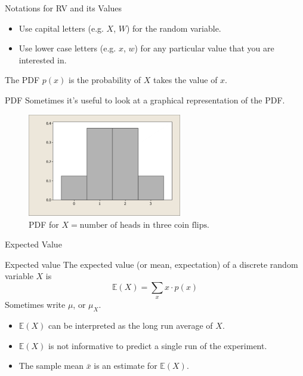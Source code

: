 \documentclass{beamer}
\newcommand{\E}{\mathbb{E}}
\let\thefootnote\relax\footnotetext{\tiny{*  Office Hours: Wed \& Fri 10:00 - 11:30 AM, KMC 8-174}}
\begin{document}
\begin{frame}{Notations for RV and its Values}
\begin{itemize}
\item Use capital letters (e.g. $X$, $W$) for the random variable.
\item Use lower case letters (e.g. $x$, $w$) for any particular value that you are interested in.
\end{itemize}

The PDF $p(x)$ is the probability of \alert{$X$} takes the value of \alert{$x$}. 
\end{frame}

\begin{frame}{PDF}
Sometimes it's useful to look at a graphical representation of the PDF.

\begin{figure}
    \caption{PDF for $X=\text{number of heads in three coin flips}$.}
    \includegraphics[width=0.6\textwidth]{figures/PDF.png}
\end{figure}

\let\thefootnote\relax{}
\end{frame}

\begin{frame}{Expected Value}
\begin{block}{Expected value}
The expected value (or mean, expectation) of a discrete random variable $X$ is
$$\E(X)=\sum_{x} x\cdot p(x)$$
Sometimes write $\mu$, or $\mu_X$.
\end{block}

\begin{itemize}
\item $\E(X)$ can be interpreted as the long run average of $X$.
\item $\E(X)$ is not informative to predict a single run of the experiment.
\item The sample mean $\bar x$ is an estimate for $\E(X)$.
\end{itemize}
\end{frame}
\end{document}
